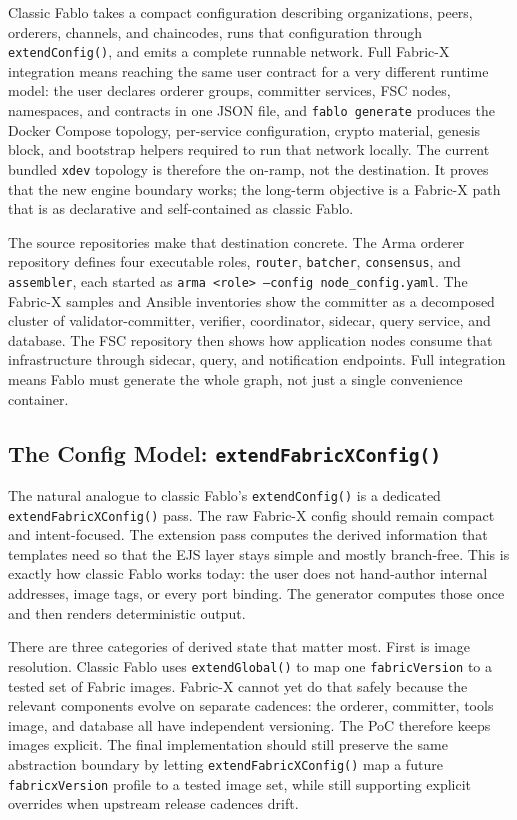 Classic Fablo takes a compact configuration describing organizations, peers, orderers, channels, and chaincodes, runs that configuration through \texttt{extendConfig()}, and emits a complete runnable network. Full Fabric-X integration means reaching the same user contract for a very different runtime model: the user declares orderer groups, committer services, FSC nodes, namespaces, and contracts in one JSON file, and \texttt{fablo generate} produces the Docker Compose topology, per-service configuration, crypto material, genesis block, and bootstrap helpers required to run that network locally. The current bundled \texttt{xdev} topology is therefore the on-ramp, not the destination. It proves that the new engine boundary works; the long-term objective is a Fabric-X path that is as declarative and self-contained as classic Fablo.

The source repositories make that destination concrete. The Arma orderer repository defines four executable roles, \texttt{router}, \texttt{batcher}, \texttt{consensus}, and \texttt{assembler}, each started as \texttt{arma <role> --config node\_config.yaml}. The Fabric-X samples and Ansible inventories show the committer as a decomposed cluster of validator-committer, verifier, coordinator, sidecar, query service, and database. The FSC repository then shows how application nodes consume that infrastructure through sidecar, query, and notification endpoints. Full integration means Fablo must generate the whole graph, not just a single convenience container.

\subsection{The Config Model: \texttt{extendFabricXConfig()}}

The natural analogue to classic Fablo's \texttt{extendConfig()} is a dedicated \texttt{extendFabricXConfig()} pass. The raw Fabric-X config should remain compact and intent-focused. The extension pass computes the derived information that templates need so that the EJS layer stays simple and mostly branch-free. This is exactly how classic Fablo works today: the user does not hand-author internal addresses, image tags, or every port binding. The generator computes those once and then renders deterministic output.

There are three categories of derived state that matter most. First is image resolution. Classic Fablo uses \texttt{extendGlobal()} to map one \texttt{fabricVersion} to a tested set of Fabric images. Fabric-X cannot yet do that safely because the relevant components evolve on separate cadences: the orderer, committer, tools image, and database all have independent versioning. The PoC therefore keeps images explicit. The final implementation should still preserve the same abstraction boundary by letting \texttt{extendFabricXConfig()} map a future \texttt{fabricxVersion} profile to a tested image set, while still supporting explicit overrides when upstream release cadences drift.

